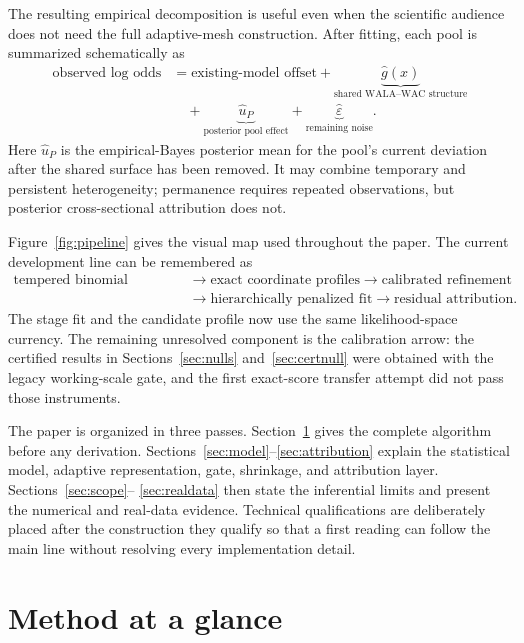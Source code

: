 \documentclass[11pt]{article}
\begin{document}
The resulting empirical decomposition is useful even when the scientific audience does not need the
full adaptive-mesh construction. After fitting, each pool is summarized schematically as
\begin{equation}\label{eq:three-way-decomposition}
\begin{aligned}
 \text{observed log odds}
 &= \text{existing-model offset}
 + \underbrace{\hat g(x)}_{\text{shared WALA--WAC structure}}\\
 &\quad + \underbrace{\hat u_P}_{\text{posterior pool effect}}
 + \underbrace{\hat\varepsilon}_{\text{remaining noise}}.
\end{aligned}
\end{equation}
Here $\hat u_P$ is the empirical-Bayes posterior mean for the pool's current deviation after the
shared surface has been removed. It may combine temporary and persistent heterogeneity; permanence
requires repeated observations, but posterior cross-sectional attribution does not.

Figure~\ref{fig:pipeline} gives the visual map used throughout the paper. The current
development line can be remembered as
\[
\begin{aligned}
\text{tempered binomial objective}
&\longrightarrow \text{exact coordinate profiles}
\longrightarrow \text{calibrated refinement}\\
&\longrightarrow \text{hierarchically penalized fit}
\longrightarrow \text{residual attribution}.
\end{aligned}
\]
The stage fit and the candidate profile now use the same likelihood-space currency. The
remaining unresolved component is the calibration arrow: the certified results in
Sections~\ref{sec:nulls} and~\ref{sec:certnull} were obtained with the legacy
working-scale gate, and the first exact-score transfer attempt did not pass those
instruments.

The paper is organized in three passes. Section~\ref{sec:overview} gives the complete algorithm before
any derivation. Sections~\ref{sec:model}--\ref{sec:attribution} explain the statistical model,
adaptive representation, gate, shrinkage, and attribution layer. Sections~\ref{sec:scope}--
\ref{sec:realdata} then state the inferential limits and present the numerical and real-data evidence.
Technical qualifications are deliberately placed after the construction they qualify so that a first
reading can follow the main line without resolving every implementation detail.

\section{Method at a glance}\label{sec:overview}
\end{document}
